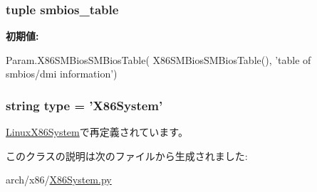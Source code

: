 \label{classX86System_1_1X86System_abd9c5cc6b7da624a69344d571bab1038}
\hypertarget{classX86System_1_1X86System_a9950505e3ac5f05cda0d31b9ba7b0dbd}{
\subsubsection[{smbios\_\-table}]{\setlength{\rightskip}{0pt plus 5cm}tuple {\bf smbios\_\-table}}}
\label{classX86System_1_1X86System_a9950505e3ac5f05cda0d31b9ba7b0dbd}
{\bfseries 初期値:}
\begin{DoxyCode}
Param.X86SMBiosSMBiosTable(
            X86SMBiosSMBiosTable(), 'table of smbios/dmi information')
\end{DoxyCode}
\hypertarget{classX86System_1_1X86System_acce15679d830831b0bbe8ebc2a60b2ca}{
\subsubsection[{type}]{\setlength{\rightskip}{0pt plus 5cm}string {\bf type} = '{\bf X86System}'}}
\label{classX86System_1_1X86System_acce15679d830831b0bbe8ebc2a60b2ca}


\hyperlink{classX86System_1_1LinuxX86System_acce15679d830831b0bbe8ebc2a60b2ca}{LinuxX86System}で再定義されています。

このクラスの説明は次のファイルから生成されました:\begin{DoxyCompactItemize}
\item 
arch/x86/\hyperlink{X86System_8py}{X86System.py}\end{DoxyCompactItemize}
